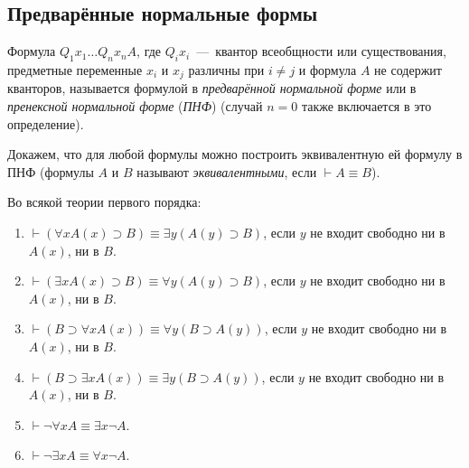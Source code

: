 \subsection{Предварённые нормальные формы}
\begin{definition*}
    Формула $Q_1x_1\dots Q_nx_nA$, где $Q_ix_i$~---~квантор всеобщности или существования, предметные переменные $x_i$ и $x_j$ различны при $i \neq j$ и формула $A$ не содержит кванторов, называется формулой в \textit{предварённой нормальной форме} или в \textit{пренексной нормальной форме} (\textit{ПНФ}) (случай $n = 0$ также включается в это определение).
\end{definition*}
Докажем, что для любой формулы можно построить эквивалентную ей формулу в ПНФ (формулы $A$ и $B$ называют \textit{эквивалентными}, если $\vdash A \equiv B$).
\begin{lemma}\label{th:quantor_bracketing}
    Во всякой теории первого порядка:
    \begin{enumerate}[label=\arabic*)]
        \item $\vdash (\forall xA(x) \supset B) \equiv \exists y(A(y) \supset B)$, если $y$ не входит свободно ни в $A(x)$, ни в $B$.
        \item $\vdash (\exists xA(x) \supset B) \equiv \forall y(A(y) \supset B)$, если $y$ не входит свободно ни в $A(x)$, ни в $B$.
        \item $\vdash (B \supset \forall xA(x)) \equiv \forall y(B \supset A(y))$, если $y$ не входит свободно ни в $A(x)$, ни в $B$.
        \item $\vdash (B \supset \exists xA(x)) \equiv \exists y(B \supset A(y))$, если $y$ не входит свободно ни в $A(x)$, ни в $B$.
        \item $\vdash \neg\forall xA \equiv \exists x\neg A$.
        \item $\vdash \neg\exists xA \equiv \forall x\neg A$.
    \end{enumerate}
\end{lemma}
